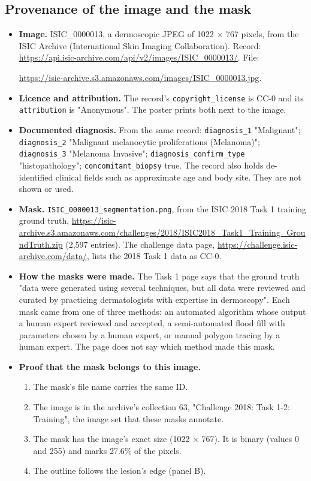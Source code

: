 \documentclass[11pt, a4paper]{article}
\begin{document}
\subsection{Provenance of the image and the mask}
\label{sec-provenance}
\begin{itemize}
\item \textbf{Image.} ISIC\_0000013, a dermoscopic JPEG of 1022 × 767 pixels, from the ISIC Archive (International Skin Imaging
Collaboration). Record: \url{https://api.isic-archive.com/api/v2/images/ISIC\_0000013/}. File:

\url{https://isic-archive.s3.amazonaws.com/images/ISIC_0000013.jpg}.
\item \textbf{Licence and attribution.} The record's \texttt{copyright\_license} is CC-0 and its \texttt{attribution} is "Anonymous". The poster
prints both next to the image.
\item \textbf{Documented diagnosis.} From the same record: \texttt{diagnosis\_1} "Malignant"; \texttt{diagnosis\_2} "Malignant melanocytic
proliferations (Melanoma)"; \texttt{diagnosis\_3} "Melanoma Invasive"; \texttt{diagnosis\_confirm\_type} "histopathology";
\texttt{concomitant\_biopsy} true. The record also holds de-identified clinical fields such as approximate age and body site.
They are not shown or used.
\item \textbf{Mask.} \texttt{ISIC\_0000013\_segmentation.png}, from the ISIC 2018 Task 1 training ground truth,
\url{https://isic-archive.s3.amazonaws.com/challenges/2018/ISIC2018\_Task1\_Training\_GroundTruth.zip} (2,597 entries).
The challenge data page, \url{https://challenge.isic-archive.com/data/}, lists the 2018 Task 1 data as CC-0.
\item \textbf{How the masks were made.} The Task 1 page says that the ground truth "data were generated using several techniques,
but all data were reviewed and curated by practicing dermatologists with expertise in dermoscopy". Each mask came
from one of three methods: an automated algorithm whose output a human expert reviewed and accepted, a semi-automated
flood fill with parameters chosen by a human expert, or manual polygon tracing by a human expert. The page does not
say which method made this mask.
\item \textbf{Proof that the mask belongs to this image.}
\begin{enumerate}
\item The mask's file name carries the same ID.
\item The image is in the archive's collection 63, "Challenge 2018: Task 1-2: Training", the image set that these masks
annotate.
\item The mask has the image's exact size (1022 × 767). It is binary (values 0 and 255) and marks 27.6\% of the pixels.
\item The outline follows the lesion's edge (panel B).
\end{enumerate}


\end{itemize}
\end{document}
